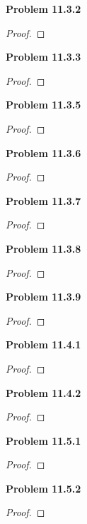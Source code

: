 \documentclass[12pt]{article}
\begin{document}
\textbf{Problem 11.3.2}
\begin{proof}

\end{proof}

\textbf{Problem 11.3.3}
\begin{proof}

\end{proof}

\textbf{Problem 11.3.5}
\begin{proof}

\end{proof}

\textbf{Problem 11.3.6}
\begin{proof}

\end{proof}

\textbf{Problem 11.3.7}
\begin{proof}

\end{proof}

\textbf{Problem 11.3.8}
\begin{proof}

\end{proof}

\textbf{Problem 11.3.9}
\begin{proof}

\end{proof}

\textbf{Problem 11.4.1}
\begin{proof}

\end{proof}

\textbf{Problem 11.4.2}
\begin{proof}

\end{proof}

\textbf{Problem 11.5.1}
\begin{proof}

\end{proof}

\textbf{Problem 11.5.2}
\begin{proof}

\end{proof}
\end{document}
